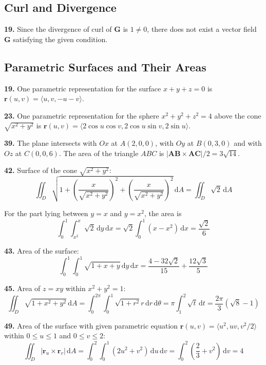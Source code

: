\documentclass[a4paper,12pt]{article}
\newcommand{\ud}{\,\mathrm{d}}
\newcommand{\exercise}[1]{\noindent\textbf{#1.}}
\begin{document}
\subsection{Curl and Divergence}
\exercise{19} Since the divergence of curl of $\mathbf G$ is $1 \neq 0$,
there does not exist a vector field $\mathbf G$ satisfying the given condition.

\subsection{Parametric Surfaces and Their Areas}
\exercise{19} One parametric representation for the surface $x + y + z = 0$ is
$\mathbf{r}(u, v) = \langle u, v, -u-v\rangle$.

\exercise{23} One parametric representation for the sphere $x^2 + y^2 + z^2 = 4$
above the cone $\sqrt{x^2 + y^2}$ is $\mathbf{r}(u, v) =
\langle 2\cos u\cos v, 2\cos u\sin v, 2\sin u\rangle$.

\exercise{39} The plane intersects with $Ox$ at $A(2, 0, 0)$, with $Oy$
at $B(0, 3, 0)$ and with $Oz$ at $C(0, 0, 6)$. The area of the triangle $ABC$
is $|\mathbf{AB}\times\mathbf{AC}|/2 = 3\sqrt{14}$.

\exercise{42} Surface of the cone $\sqrt{x^2 + y^2}$:
\[\iint_D\sqrt{1 + \left(\frac{x}{\sqrt{x^2+y^2}}\right)^2
+ \left(\frac{x}{\sqrt{x^2 + y^2}}\right)^2}\ud A
= \iint_D\sqrt 2\ud A\]

For the part lying between $y = x$ and $y = x^2$, the area is
\[\int_0^1\int_{x^2}^x\sqrt{2}\ud y\ud x
= \sqrt 2\int_0^1(x - x^2)\ud x
= \frac{\sqrt 2}{6}\]

\exercise{43} Area of the surface:
\[\int_0^1\int_0^1\sqrt{1 + x + y}\ud y\ud x
= \frac{4 - 32\sqrt 2}{15} + \frac{12\sqrt 3}{5}\]

\exercise{45} Area of $z = xy$ within $x^2 + y^2 = 1$:
\[\iint_D\sqrt{1 + x^2 + y^2}\ud A
= \int_0^{2\pi}\int_0^1\sqrt{1 + r^2}r\ud r\ud\theta
= \pi\int_1^2\sqrt t\ud t
= \frac{2\pi}{3}\left(\sqrt 8 - 1\right)\]

\exercise{49} Area of the surface with given parametric equation
$\mathbf{r}(u, v) = \langle u^2, uv, v^2/2\rangle$ within $0 \leq u \leq 1$ and
$0 \leq v \leq 2$:
\[\iint_D|\mathbf{r}_u\times\mathbf{r}_v|\ud A
= \int_0^2\int_0^1(2u^2 + v^2)\ud u\ud v
= \int_0^2\left(\frac{2}{3} + v^2\right)\ud v = 4\]
\end{document}
